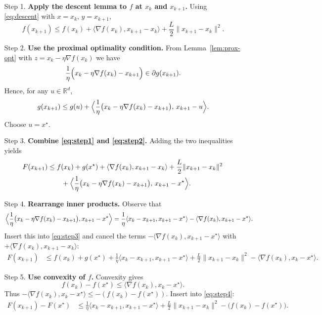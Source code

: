 \documentclass{article}
\newcommand{\grad}{\nabla}
\newcommand{\R}{\mathbb{R}}
\begin{document}
\begin{enumerate}
\item[Step 1.] \textbf{Apply the descent lemma to $f$ at $x_{k}$ and $x_{k+1}$.}
Using \eqref{eq:descent} with $x=x_{k}$, $y=x_{k+1}$,
\begin{equation}
\label{eq:step1}
f(x_{k+1})\le f(x_{k})+\langle\grad f(x_{k}),x_{k+1}-x_{k}\rangle
+\frac{L}{2}\|x_{k+1}-x_{k}\|^{2}.
\end{equation}

\item[Step 2.] \textbf{Use the proximal optimality condition.}
From Lemma~\ref{lem:prox-opt} with $z=x_{k}-\eta\grad f(x_{k})$ we have
\[
\frac{1}{\eta}\Bigl(x_{k}-\eta\grad f(x_{k})-x_{k+1}\Bigr)\in\partial g(x_{k+1}).
\]
Hence, for any $u\in\R^{d}$,
\begin{equation}
\label{eq:step2}
g(x_{k+1})\le g(u)+\Bigl\langle\frac{1}{\eta}\bigl(x_{k}-\eta\grad f(x_{k})-x_{k+1}\bigr),
\,x_{k+1}-u\Bigr\rangle .
\end{equation}
Choose $u=x^{\star}$.

\item[Step 3.] \textbf{Combine \eqref{eq:step1} and \eqref{eq:step2}.}
Adding the two inequalities yields
\begin{align}
F(x_{k+1}) &\le f(x_{k})+g(x^{\star})
+\langle\grad f(x_{k}),x_{k+1}-x_{k}\rangle
+\frac{L}{2}\|x_{k+1}-x_{k}\|^{2}\nonumber\\
&\qquad +\Bigl\langle\frac{1}{\eta}\bigl(x_{k}-\eta\grad f(x_{k})-x_{k+1}\bigr),
\,x_{k+1}-x^{\star}\Bigr\rangle .\label{eq:step3}
\end{align}

\item[Step 4.] \textbf{Rearrange inner products.}
Observe that
\[
\Bigl\langle\frac{1}{\eta}\bigl(x_{k}-\eta\grad f(x_{k})-x_{k+1}\bigr),x_{k+1}-x^{\star}\Bigr\rangle
= \frac{1}{\eta}\langle x_{k}-x_{k+1},x_{k+1}-x^{\star}\rangle
-\langle\grad f(x_{k}),x_{k+1}-x^{\star}\rangle .
\]
Insert this into \eqref{eq:step3} and cancel the terms
$-\langle\grad f(x_{k}),x_{k+1}-x^{\star}\rangle$
with $+\langle\grad f(x_{k}),x_{k+1}-x_{k}\rangle$:
\begin{align}
F(x_{k+1}) &\le f(x_{k})+g(x^{\star})
+\frac{1}{\eta}\langle x_{k}-x_{k+1},x_{k+1}-x^{\star}\rangle
+\frac{L}{2}\|x_{k+1}-x_{k}\|^{2}
-\langle\grad f(x_{k}),x_{k}-x^{\star}\rangle .\label{eq:step4}
\end{align}

\item[Step 5.] \textbf{Use convexity of $f$.}
Convexity gives
\[
f(x_{k})-f(x^{\star})\le\langle\grad f(x_{k}),x_{k}-x^{\star}\rangle .
\]
Thus $-\langle\grad f(x_{k}),x_{k}-x^{\star}\rangle\le -(f(x_{k})-f(x^{\star}))$.
Insert into \eqref{eq:step4}:
\begin{align}
F(x_{k+1})-F(x^{\star})
&\le \frac{1}{\eta}\langle x_{k}-x_{k+1},x_{k+1}-x^{\star}\rangle
+\frac{L}{2}\|x_{k+1}-x_{k}\|^{2}
-\bigl(f(x_{k})-f(x^{\star})\bigr). \label{eq:step5}
\end{align}


\end{enumerate}
\end{document}
